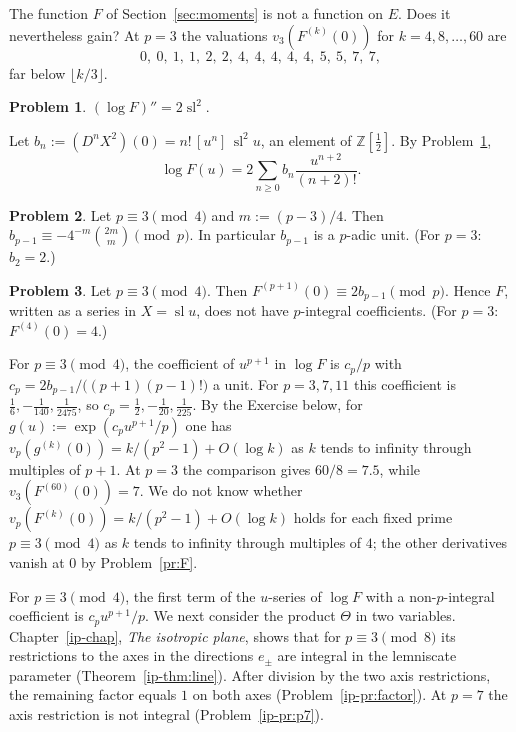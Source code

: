 \documentclass[reqno]{amsart}
\newcounter{chap}
\theoremstyle{definition}
\newtheorem{problem}{Problem}[section]
\theoremstyle{plain}
\newcommand{\Z}{\mathbb{Z}}
\newcommand{\sll}{\operatorname{sl}}
\begin{document}
The function \(F\) of Section~\ref{sec:moments} is not a function on \(E\).  Does it nevertheless gain?  At \(p = 3\) the valuations \(v_3(F^{(k)}(0))\) for \(k = 4, 8, \dotsc, 60\) are
\[
  0,\ 0,\ 1,\ 1,\ 2,\ 2,\ 4,\ 4,\ 4,\ 4,\ 4,\ 5,\ 5,\ 7,\ 7,
\]
far below \(\lfloor k/3 \rfloor\).

\begin{problem}\label{pr:logF}
\((\log F)'' = 2\sll^2\).
\end{problem}

Let \(b_n := (D^n X^2)(0) = n!\, [u^n]\, \sll^2 u\), an element of \(\Z[\tfrac12]\).  By Problem~\ref{pr:logF},
\[
  \log F(u) = 2 \sum_{n \ge 0} b_n \frac{u^{n+2}}{(n+2)!} .
\]

\begin{problem}\label{pr:bp}
Let \(p \equiv 3 \pmod 4\) and \(m := (p-3)/4\).  Then \(b_{p-1} \equiv -4^{-m}\binom{2m}{m} \pmod p\).  In particular \(b_{p-1}\) is a \(p\)-adic unit.  (For \(p = 3\): \(b_2 = 2\).)
\end{problem}

\begin{problem}\label{pr:failure}
Let \(p \equiv 3 \pmod 4\).  Then \(F^{(p+1)}(0) \equiv 2 b_{p-1} \pmod p\).  Hence \(F\), written as a series in \(X = \sll u\), does not have \(p\)-integral coefficients.  (For \(p = 3\): \(F^{(4)}(0) = 4\).)
\end{problem}

For \(p \equiv 3 \pmod 4\), the coefficient of \(u^{p+1}\) in \(\log F\) is \(c_p/p\) with \(c_p = 2b_{p-1}/\bigl((p+1)(p-1)!\bigr)\) a unit.  For \(p = 3, 7, 11\) this coefficient is \(\tfrac16, -\tfrac1{140}, \tfrac1{2475}\), so \(c_p = \tfrac12, -\tfrac1{20}, \tfrac1{225}\).  By the Exercise below, for \(g(u) := \exp(c_p u^{p+1}/p)\) one has \(v_p(g^{(k)}(0)) = k/(p^2-1) + O(\log k)\) as \(k\) tends to infinity through multiples of \(p+1\).  At \(p=3\) the comparison gives \(60/8=7.5\), while \(v_3(F^{(60)}(0))=7\).  We do not know whether \(v_p(F^{(k)}(0)) = k/(p^2-1) + O(\log k)\) holds for each fixed prime \(p \equiv 3 \pmod 4\) as \(k\) tends to infinity through multiples of \(4\); the other derivatives vanish at \(0\) by Problem~\ref{pr:F}.

For \(p \equiv 3 \pmod 4\), the first term of the \(u\)-series of \(\log F\) with a non-\(p\)-integral coefficient is \(c_p u^{p+1}/p\).  We next consider the product \(\Theta\) in two variables.  Chapter~\ref{ip-chap}, \emph{The isotropic plane}, shows that for \(p \equiv 3 \pmod 8\) its restrictions to the axes in the directions \(e_\pm\) are integral in the lemniscate parameter (Theorem~\ref{ip-thm:line}).  After division by the two axis restrictions, the remaining factor equals \(1\) on both axes (Problem~\ref{ip-pr:factor}).  At \(p = 7\) the axis restriction is not integral (Problem~\ref{ip-pr:p7}).
\end{document}
